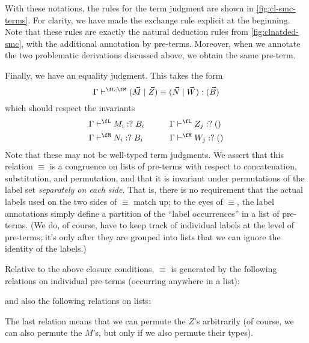 \documentclass{book}
\let\types\vdash
\newcommand{\pc}{\mathrel{\mathord{:}?}}
\def\ttt{\mathsf{tt}}
\def\pair#1#2{\langle #1,#2\rangle}
\begin{document}
With these notations, the rules for the term judgment are shown  in \cref{fig:cl-smc-terms}.
For clarity, we have made the exchange rule explicit at the beginning.
Note that these rules are exactly the natural deduction rules from \cref{fig:clnatded-smc}, with the additional annotation by pre-terms.
Moreover, when we annotate the two problematic derivations discussed above, we obtain the same pre-term.

Finally, we have an equality judgment.
This takes the form
\[\Gamma \types^{\fL;\fM} (\vec M\mid\vec Z)\equiv (\vec N\mid\vec W) :(\vec B)\]
which should respect the invariants
\begin{alignat*}{2}
  \Gamma&\types^{\fL} M_i\pc B_i &\qquad
  \Gamma&\types^{\fL} Z_j\pc ()\\
  \Gamma&\types^{\fM} N_i\pc B_i &\qquad
  \Gamma&\types^{\fM} W_j\pc ()
\end{alignat*}
Note that these may not be well-typed term judgments.
We assert that this relation $\equiv$ is a congruence on lists of pre-terms with respect to concatenation, substitution, and permutation, and that it is invariant under permutations of the label set \fA \emph{separately on each side}.
That is, there is no requirement that the actual labels used on the two sides of $\equiv$ match up; to the eyes of $\equiv$, the label annotations simply define a partition of the ``label occurrences'' in a list of pre-terms.
(We do, of course, have to keep track of individual labels at the level of pre-terms; it's only after they are grouped into lists that we can ignore the identity of the labels.)

Relative to the above closure conditions, $\equiv$ is generated by the following relations on individual pre-terms (occurring anywhere in a list):
and also the following relations on lists:
The last relation means that we can permute the $Z$'s arbitrarily (of course, we can also permute the $M$'s, but only if we also permute their types).
\end{document}
